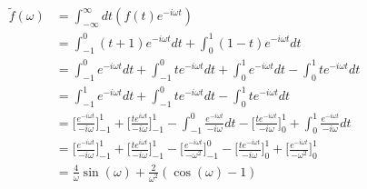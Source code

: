 \documentclass{article}
\newcommand{\w}{\omega}
\begin{document}
\begin{align*}
    \tilde{f}(\w) &= \int_{-\infty}^\infty dt\left(f(t)e^{-i\w t}\right)\\
    &= \int_{-1}^0 (t+1)e^{-i\w t}dt + \int_{0}^1(1-t)e^{-i\w t}dt\\
    &= \int_{-1}^0 e^{-i\w t}dt + \int_{-1}^0 te^{-i\w t}dt + \int_{0}^1e^{-i\w t}dt - \int_{0}^1te^{-i\w t}dt\\
    &= \int_{-1}^1 e^{-i\w t}dt + \int_{-1}^0 te^{-i\w t}dt - \int_{0}^1te^{-i\w t}dt\\
    &= \Bigg[\frac{e^{-i\w t}}{-i\w}\Bigg]_{-1}^1 +\Bigg[\frac{te^{i\w t}}{-i\w}\Bigg]_{ -1}^1 - \int_{-1}^0 \frac{e^{-i\w t}}{-i\w}dt - \Bigg[\frac{te^{-i\w t}}{-i\w}\Bigg]_{0}^1 + \int_{0}^1\frac{e^{-i\w t}}{-i\w}dt\\
    &= \Bigg[\frac{e^{-i\w t}}{-i\w}\Bigg]_{-1}^1 +\Bigg[\frac{te^{i\w t}}{-i\w}\Bigg]_{ -1}^1 - \Bigg[\frac{e^{-i\w t}}{-\w^2}\Bigg]_{-1}^0 - \Bigg[\frac{te^{-i\w t}}{-i\w}\Bigg]_{0}^1 + \Bigg[\frac{e^{-i\w t}}{-\w^2}\Bigg]_{0}^1\\
    &= \frac{4}{\w}\sin(\w) + \frac{2}{\w^2}\left(\cos(\w) - 1\right)
\end{align*}

\end{document}
